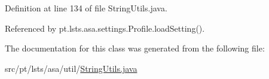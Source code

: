 Definition at line 134 of file String\+Utils.\+java.



Referenced by pt.\+lsts.\+asa.\+settings.\+Profile.\+load\+Setting().



The documentation for this class was generated from the following file\+:\begin{DoxyCompactItemize}
\item 
src/pt/lsts/asa/util/\hyperlink{StringUtils_8java}{String\+Utils.\+java}\end{DoxyCompactItemize}
